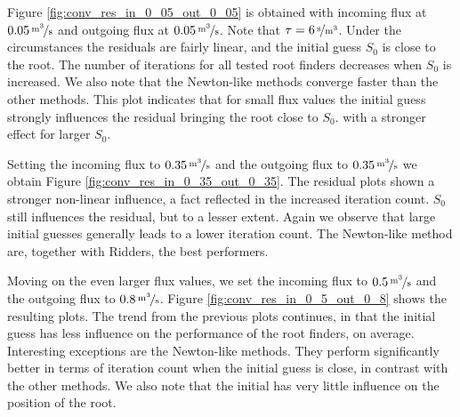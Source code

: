 Figure \ref{fig:conv_res_in_0_05_out_0_05} is obtained with incoming flux at $\unitfrac[0.05]{m^3}{s}$ and outgoing flux at $\unitfrac[0.05]{m^3}{s}$. Note that $\tau = \unitfrac[6]{s}{m^3}$. Under the circumstances the residuals are fairly linear, and the initial guess $S_0$ is close to the root. The number of iterations for all tested root finders decreases when $S_0$ is increased. We also note that the Newton-like methods converge faster than the other methods. This plot indicates that for small flux values the initial guess strongly influences the residual bringing the root close to $S_0$. with a stronger effect for larger $S_0$. 

Setting the incoming flux to $\unitfrac[0.35]{m^3}{s}$ and the outgoing flux to $\unitfrac[0.35]{m^3}{s}$ we obtain Figure \ref{fig:conv_res_in_0_35_out_0_35}. The residual plots shown a stronger non-linear influence, a fact reflected in the increased iteration count. $S_0$ still influences the residual, but to a lesser extent. Again we observe that large initial guesses generally leads to a lower iteration count. The Newton-like method are, together with Ridders, the best performers.

Moving on the even larger flux values, we set the incoming flux to $\unitfrac[0.5]{m^3}{s}$ and the outgoing flux to $\unitfrac[0.8]{m^3}{s}$. Figure \ref{fig:conv_res_in_0_5_out_0_8} shows the resulting plots. The trend from the previous plots continues, in that the initial guess has less influence on the performance of the root finders, on average. Interesting exceptions are the Newton-like methods. They perform significantly better in terms of iteration count when the initial guess is close, in contrast with the other methods. We also note that the initial has very little influence on the position of the root.




